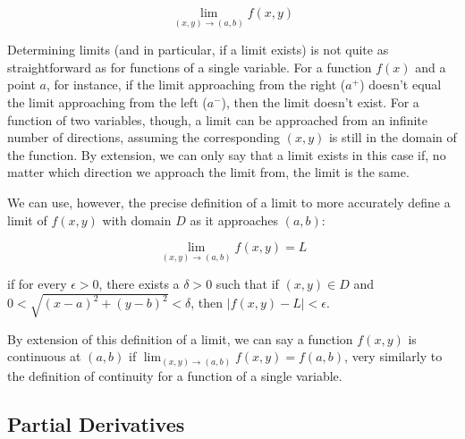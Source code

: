 \documentclass[12pt]{article}
\begin{document}
$$\lim_{(x,y)\to(a,b)}f(x,y)$$

Determining limits (and in particular, if a limit exists) is not quite as straightforward as for functions of a single variable. For a function $f(x)$ and a point $a$, for instance, if the limit approaching from the right ($a^{+}$) doesn't equal the limit approaching from the left ($a^{-}$), then the limit doesn't exist. For a function of two variables, though, a limit can be approached from an infinite number of directions, assuming the corresponding $(x,y)$ is still in the domain of the function. By extension, we can only say that a limit exists in this case if, no matter which direction we approach the limit from, the limit is the same.

We can use, however, the precise definition of a limit to more accurately define a limit of $f(x,y)$ with domain $D$ as it approaches $(a,b)$:

$$\lim_{(x,y)\to(a,b)} f(x,y) = L$$

if for every $\epsilon > 0$, there exists a $\delta >0$ such that if $(x,y)\in D$ and $0<\sqrt{(x-a)^2+(y-b)^2}<\delta$, then $|f(x,y)-L|<\epsilon$.

By extension of this definition of a limit, we can say a function $f(x,y)$ is continuous at $(a,b)$ if $\lim_{(x,y)\to(a,b)} f(x,y) = f(a,b)$, very similarly to the definition of continuity for a function of a single variable.

\subsection{Partial Derivatives}
\end{document}
